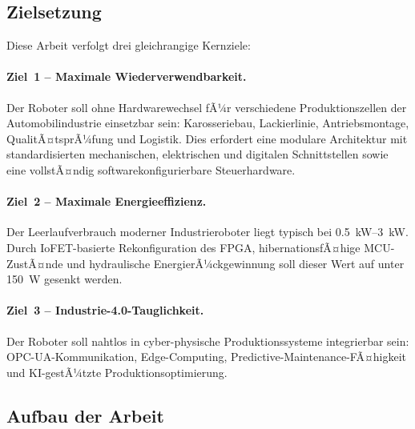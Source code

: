 ﻿\documentclass[a4paper,12pt]{scrreprt}
\theoremstyle{definition}
\begin{document}
\subsection{Zielsetzung}

Diese Arbeit verfolgt drei gleichrangige Kernziele:

\paragraph{Ziel~1 -- Maximale Wiederverwendbarkeit.}
Der Roboter soll ohne Hardwarewechsel fÃ¼r verschiedene Produktionszellen
der Automobilindustrie einsetzbar sein: Karosseriebau, Lackierlinie,
Antriebsmontage, QualitÃ¤tsprÃ¼fung und Logistik. Dies erfordert eine
modulare Architektur mit standardisierten mechanischen, elektrischen und
digitalen Schnittstellen sowie eine vollstÃ¤ndig softwarekonfigurierbare
Steuerhardware.

\paragraph{Ziel~2 -- Maximale Energieeffizienz.}
Der Leerlaufverbrauch moderner Industrieroboter liegt typisch bei
\SIrange{0.5}{3}{\kilo\watt}. Durch IoFET-basierte Rekonfiguration
des FPGA, hibernationsfÃ¤hige MCU-ZustÃ¤nde und hydraulische
EnergierÃ¼ckgewinnung soll dieser Wert auf unter \SI{150}{\watt}
gesenkt werden.

\paragraph{Ziel~3 -- Industrie-4.0-Tauglichkeit.}
Der Roboter soll nahtlos in cyber-physische Produktionssysteme
integrierbar sein: OPC-UA-Kommunikation, Edge-Computing,
Predictive-Maintenance-FÃ¤higkeit und KI-gestÃ¼tzte
Produktionsoptimierung.

\subsection{Aufbau der Arbeit}
\end{document}
